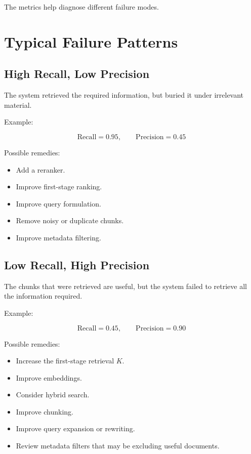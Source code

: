 \documentclass[12pt, a4paper]{article}
\begin{document}
The metrics help diagnose different failure modes.

\section{Typical Failure Patterns}

\subsection{High Recall, Low Precision}

The system retrieved the required information, but buried it under irrelevant material.

Example:

\[
\text{Recall}=0.95,\qquad
\text{Precision}=0.45
\]

Possible remedies:

\begin{itemize}
    \item Add a reranker.
    \item Improve first-stage ranking.
    \item Improve query formulation.
    \item Remove noisy or duplicate chunks.
    \item Improve metadata filtering.
\end{itemize}

\subsection{Low Recall, High Precision}

The chunks that were retrieved are useful, but the system failed to retrieve all the information required.

Example:

\[
\text{Recall}=0.45,\qquad
\text{Precision}=0.90
\]

Possible remedies:

\begin{itemize}
    \item Increase the first-stage retrieval $K$.
    \item Improve embeddings.
    \item Consider hybrid search.
    \item Improve chunking.
    \item Improve query expansion or rewriting.
    \item Review metadata filters that may be excluding useful documents.
\end{itemize}
\end{document}
